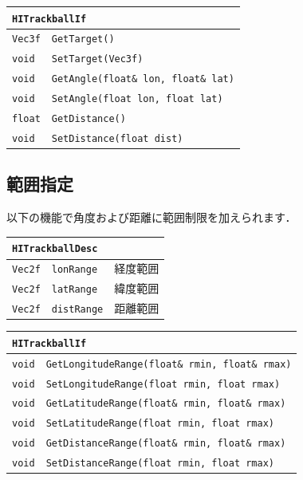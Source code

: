 \begin{center}
\begin{tabular}{p{.15\hsize}p{.75\hsize}}
\multicolumn{2}{l}{\texttt{HITrackballIf}}									\\ \midrule
\texttt{Vec3f}	& \texttt{GetTarget()}							\\
\texttt{void} 	& \texttt{SetTarget(Vec3f)}						\\
\texttt{void} 	& \texttt{GetAngle(float\& lon, float\& lat)}	\\
\texttt{void} 	& \texttt{SetAngle(float lon, float lat)}		\\
\texttt{float} 	& \texttt{GetDistance()}						\\
\texttt{void} 	& \texttt{SetDistance(float dist)}				\\
\end{tabular}
\end{center}

\subsection*{範囲指定}

\KLUDGE 以下の機能で角度および距離に範囲制限を加えられます．

\begin{center}
\begin{tabular}{p{.15\hsize}p{.5\hsize}p{.25\hsize}}
\multicolumn{3}{l}{\texttt{HITrackballDesc}}					\\ \midrule
\texttt{Vec2f}	&	\texttt{lonRange}		& 経度範囲			\\
\texttt{Vec2f}	&	\texttt{latRange}		& 緯度範囲			\\
\texttt{Vec2f}	&	\texttt{distRange}		& 距離範囲			\\
\end{tabular}
\end{center}

\begin{center}
\begin{tabular}{p{.15\hsize}p{.75\hsize}}
\multicolumn{2}{l}{\texttt{HITrackballIf}}									\\ \midrule
\texttt{void} 	& \texttt{GetLongitudeRange(float\& rmin, float\& rmax)}	\\
\texttt{void} 	& \texttt{SetLongitudeRange(float rmin, float rmax)}		\\
\texttt{void} 	& \texttt{GetLatitudeRange(float\& rmin, float\& rmax)}		\\
\texttt{void} 	& \texttt{SetLatitudeRange(float rmin, float rmax)}			\\
\texttt{void} 	& \texttt{GetDistanceRange(float\& rmin, float\& rmax)}		\\
\texttt{void} 	& \texttt{SetDistanceRange(float rmin, float rmax)}			\\
\end{tabular}
\end{center}


